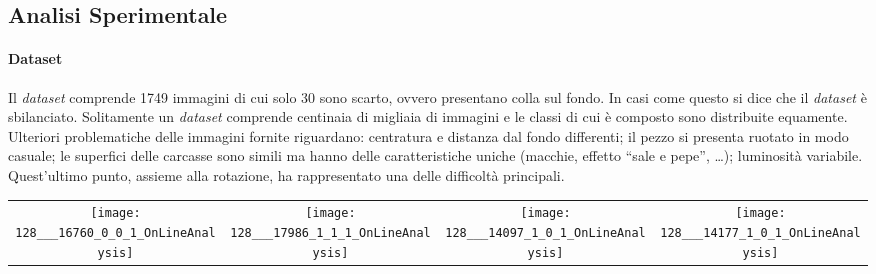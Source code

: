 \documentclass[a0,portrait]{a0poster}
\begin{document}
\begin{multicols}{2}
\section*{Analisi Sperimentale}
\paragraph{Dataset}
Il \textit{dataset} comprende 1749 immagini di cui solo 30 sono scarto, ovvero presentano colla sul fondo.
In casi come questo si dice che il \textit{dataset} è sbilanciato.
Solitamente un \textit{dataset} comprende centinaia di migliaia di immagini e le classi di cui è composto sono distribuite equamente.
Ulteriori problematiche delle immagini fornite riguardano:
centratura e distanza dal fondo differenti;
il pezzo si presenta ruotato in modo casuale;
le superfici delle carcasse sono simili ma hanno delle caratteristiche uniche (macchie, effetto ``sale e pepe'', \dots);
luminosità variabile.
Quest'ultimo punto, assieme alla rotazione, ha rappresentato una delle difficoltà principali.
\\
\begin{center}
    \begin{tabular}{cccc} \label{griglia_dataset}
      \texttt{[image: 128\_\_\_16760\_0\_0\_1\_OnLineAnalysis]} &
      \texttt{[image: 128\_\_\_17986\_1\_1\_1\_OnLineAnalysis]} &
      \texttt{[image: 128\_\_\_14097\_1\_0\_1\_OnLineAnalysis]} &
      \texttt{[image: 128\_\_\_14177\_1\_0\_1\_OnLineAnalysis]}
    \end{tabular}
\end{center}
  




\end{multicols}
\end{document}
